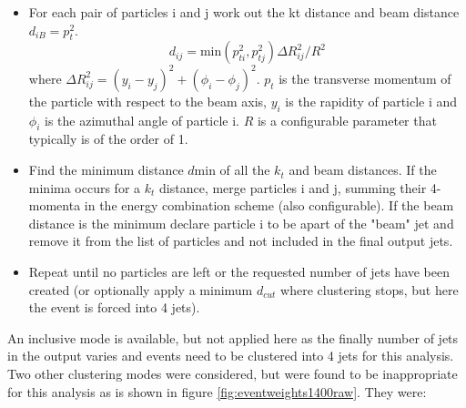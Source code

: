 \begin{itemize}
\item For each pair of particles i and j work out the kt distance and beam distance $d_{iB} = p_{t}^{2}$.
\begin{equation}
d_{ij} = \text{min}(p_{ti}^{2}, p_{tj}^{2}){\Delta}R^{2}_{ij}/R^{2}
\end{equation}
where ${\Delta}R^{2}_{ij} = (y_{i} - y_{j})^2 + (\phi_{i} - \phi_{j})^2$.  $p_{t}$ is the transverse momentum of the particle with respect to the beam axis, $y_{i}$ is the rapidity of particle i and $\phi_{i}$ is the azimuthal angle of particle i. $R$ is a configurable parameter that typically is of the order of 1.
\item Find the minimum distance $d\text{min}$ of all the $k_{t}$ and beam distances. If the minima occurs for a $k_{t}$ distance, merge particles i and j, summing their 4-momenta in the energy combination scheme (also configurable). If the beam distance is the minimum declare particle i to be apart of the "beam" jet and remove it from the list of particles and not included in the final output jets.
\item Repeat until no particles are left or the requested number of jets have been created (or optionally apply a minimum $d_{cut}$ where clustering stops, but here the event is forced into 4 jets).
\end{itemize}

An inclusive mode is available, but not applied here as the finally number of jets in the output varies and events need to be clustered into 4 jets for this analysis.  Two other clustering modes were considered, but were found to be inappropriate for this analysis as is shown in figure \ref{fig:eventweights1400raw}. They were:

